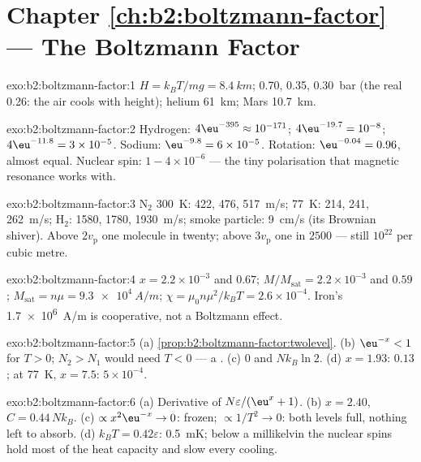 \section*{Chapter \ref{ch:b2:boltzmann-factor} --- The Boltzmann Factor}

\begin{solution}{exo:b2:boltzmann-factor:1}
$H = k_BT/mg = \qty{8.4}{km}$; \qty{0.70}{}, \qty{0.35}{}, \qty{0.30}{bar} (the real
\qty{0.26}{}: the air cools with height); helium \qty{61}{km}; Mars
\qty{10.7}{km}.
\end{solution}

\begin{solution}{exo:b2:boltzmann-factor:2}
Hydrogen: $4\eu^{-395} \approx 10^{-171}$; $4\eu^{-19.7} = 10^{-8}$; $4\eu^{-11.8} = 3 \times
10^{-5}$. Sodium: $\eu^{-9.8} = 6 \times 10^{-5}$. Rotation: $\eu^{-0.04} = 0.96$, almost
equal. Nuclear spin: $1 - 4 \times 10^{-6}$ --- the tiny polarisation that
magnetic resonance works with.
\end{solution}

\begin{solution}{exo:b2:boltzmann-factor:3}
N$_2$ \qty{300}{K}: \qty{422}{}, \qty{476}{}, \qty{517}{m/s}; \qty{77}{K}: \qty{214}{}, \qty{241}{},
\qty{262}{m/s}; H$_2$: \qty{1580}{}, \qty{1780}{}, \qty{1930}{m/s}; smoke particle:
\qty{9}{cm/s} (its Brownian shiver). Above $2v_{\text{p}}$ one molecule in
twenty; above $3v_{\text{p}}$ one in $2500$ --- still $10^{22}$ per cubic metre.
\end{solution}

\begin{solution}{exo:b2:boltzmann-factor:4}
$x = 2.2 \times 10^{-3}$ and $0.67$; $M/M_{\text{sat}} = 2.2 \times 10^{-3}$ and $0.59$;
$M_{\text{sat}} = n\mu = \qty{9.3e4}{A/m}$; $\chi = \mu_0n\mu^2/k_BT = 2.6 \times 10^{-4}$.
Iron's \qty{1.7e6}{A/m} is cooperative, not a Boltzmann effect.
\end{solution}

\begin{solution}{exo:b2:boltzmann-factor:5}
(a) \cref{prop:b2:boltzmann-factor:twolevel}. (b) $\eu^{-x} < 1$ for $T > 0$;
$N_2 > N_1$ would need $T < 0$ --- a . (c) $0$ and
$Nk_B\ln 2$. (d) $x = 1.93$: $0.13$; at \qty{77}{K}, $x = 7.5$: $5 \times 10^{-4}$.
\end{solution}

\begin{solution}{exo:b2:boltzmann-factor:6}
(a) Derivative of $N\varepsilon/(\eu^x + 1)$. (b) $x = 2.40$, $C = 0.44\,Nk_B$.
(c) $\propto x^2\eu^{-x} \to 0$: frozen; $\propto 1/T^2 \to 0$: both levels full,
nothing left to absorb. (d) $k_BT = 0.42\varepsilon$: \qty{0.5}{mK}; below a
millikelvin the nuclear spins hold most of the heat capacity and
slow every cooling.
\end{solution}

